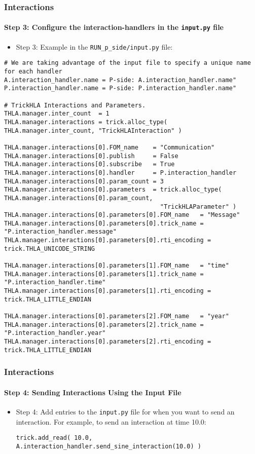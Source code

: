    \begin{frame}[fragile]
      \frametitle{Interactions}
      \framesubtitle{Step 3: Configure the interaction-handlers in the \texttt{input.py} file}
      \begin{itemize}
         \item Step 3: Example in the \texttt{RUN\_p\_side/input.py} file:
      \end{itemize}
\begin{Verbatim}[frame=single, fontsize=\tiny]
# We are taking advantage of the input file to specify a unique name for each handler
A.interaction_handler.name = P-side: A.interaction_handler.name"
P.interaction_handler.name = P-side: P.interaction_handler.name"

# TrickHLA Interactions and Parameters.
THLA.manager.inter_count  = 1
THLA.manager.interactions = trick.alloc_type( THLA.manager.inter_count, "TrickHLAInteraction" )

THLA.manager.interactions[0].FOM_name    = "Communication"
THLA.manager.interactions[0].publish     = False
THLA.manager.interactions[0].subscribe   = True
THLA.manager.interactions[0].handler     = P.interaction_handler
THLA.manager.interactions[0].param_count = 3
THLA.manager.interactions[0].parameters  = trick.alloc_type( THLA.manager.interactions[0].param_count,
                                           "TrickHLAParameter" )
THLA.manager.interactions[0].parameters[0].FOM_name   = "Message"
THLA.manager.interactions[0].parameters[0].trick_name = "P.interaction_handler.message"
THLA.manager.interactions[0].parameters[0].rti_encoding = trick.THLA_UNICODE_STRING

THLA.manager.interactions[0].parameters[1].FOM_name   = "time"
THLA.manager.interactions[0].parameters[1].trick_name = "P.interaction_handler.time"
THLA.manager.interactions[0].parameters[1].rti_encoding = trick.THLA_LITTLE_ENDIAN

THLA.manager.interactions[0].parameters[2].FOM_name   = "year"
THLA.manager.interactions[0].parameters[2].trick_name = "P.interaction_handler.year"
THLA.manager.interactions[0].parameters[2].rti_encoding = trick.THLA_LITTLE_ENDIAN
\end{Verbatim}
   \end{frame}

   \begin{frame}[fragile]
      \frametitle{Interactions}
      \framesubtitle{Step 4: Sending Interactions Using the Input File}
      \begin{itemize}
         \item Step 4: Add entries to the \texttt{input.py} file for when you
         want to send an interaction. For example, to send an interaction at
         time 10.0:
      \vspace{0.2cm}
\begin{Verbatim}[frame=single, fontsize=\tiny]
trick.add_read( 10.0, A.interaction_handler.send_sine_interaction(10.0) )
\end{Verbatim}
      \end{itemize}
   \end{frame}

